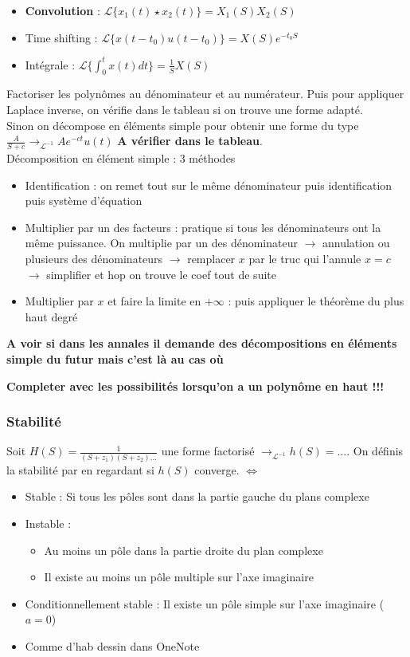 \documentclass{article}
\theoremstyle{plain}%
\theoremstyle{definition}
\theoremstyle{remark}
\begin{document}
\begin{itemize}
    \item \textbf{Convolution} : $ \mathcal{L}\{x_1(t) \star x_2(t)\} = X_1(S) X_2(S)$ 
    \item Time shifting : $ \mathcal{L}\{x(t-t_0) u(t - t_0)\} = X(S)e^{-t_0 S}$ 
    \item Intégrale : $ \mathcal{L}\{\int_{0}^{t}x(t)dt\} = \frac{1}{S}X(S) $ 
\end{itemize}
Factoriser les polynômes au dénominateur et au numérateur. Puis pour appliquer Laplace inverse, on vérifie dans le tableau si on trouve une forme adapté. \\
Sinon on décompose en éléments simple pour obtenir une forme du type $ \frac{A}{S+c} \to _{\mathcal{L}^{-1}} A e^{-ct}u(t)$ \textbf{A vérifier dans le tableau}.\\

Décomposition en élément simple : 3 méthodes \begin{itemize}
    \item Identification : on remet tout sur le même dénominateur puis identification puis système d'équation
    \item Multiplier par un des facteurs : pratique si tous les dénominateurs ont la même puissance. On multiplie par un des dénominateur $\rightarrow$ annulation ou plusieurs des dénominateurs $\rightarrow$ remplacer $ x $ par le truc qui l'annule $ x=c $ $\rightarrow$ simplifier et hop on trouve le coef tout de suite
    \item Multiplier par $ x $  et faire la limite en $ +\infty  $  : puis appliquer le théorème du plus haut degré
\end{itemize}
\textbf{A voir si dans les annales il demande des décompositions en éléments simple du futur mais c'est là au cas où}

\textbf{Completer avec les possibilités lorsqu'on a un polynôme en haut !!! }

\subsubsection{Stabilité}
Soit $ H(S) = \frac{1}{(S+z_1)(S+z_2)\dots} $ une forme factorisé $ \to_{\mathcal{L}^{-1}} h(S)=\dots$. On définis la stabilité par en regardant si $ h(S) $ converge. $ \Leftrightarrow $ \begin{itemize}
    \item Stable : Si tous les pôles sont dans la partie gauche du plans complexe
    \item Instable : \begin{itemize}
        \item Au moins un pôle dans la partie droite du plan complexe
        \item Il existe au moins un pôle multiple sur l'axe imaginaire
    \end{itemize}
    \item Conditionnellement stable : Il existe un pôle simple sur l'axe imaginaire ($a=0$)
    \item Comme d'hab dessin dans OneNote
\end{itemize}
\end{document}
